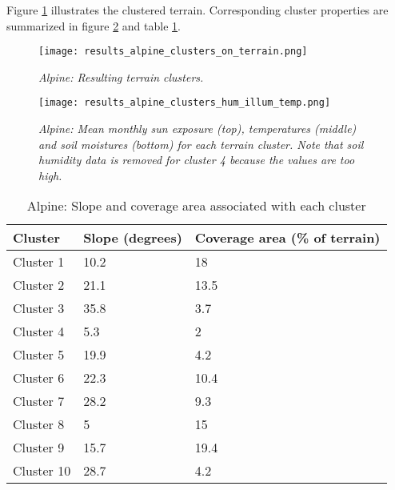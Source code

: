 Figure \ref{fig:results_alpine_terrain_clusters} illustrates the clustered terrain. Corresponding cluster properties are summarized in figure \ref{fig:results_alpine_cluster_hum_temp_illum} and table \ref{tab:results_alpine_cluster_slope_covarea}. 

\begin{figure}[htb!]
\center
	\texttt{[image: results\_alpine\_clusters\_on\_terrain.png]}
	\caption{\textit{Alpine: Resulting terrain clusters.}}
	\label{fig:results_alpine_terrain_clusters}
\end{figure}

\begin{figure}[htb!]
\center
	\texttt{[image: results\_alpine\_clusters\_hum\_illum\_temp.png]}
	\caption{ \textit{Alpine: Mean monthly sun exposure (top), temperatures (middle) and soil moistures (bottom) for each terrain cluster. Note that soil humidity data is removed for cluster 4 because the values are too high.}}
	\label{fig:results_alpine_cluster_hum_temp_illum}
\end{figure}

\begin{table}[htb!]
  \centering
	    \begin{tabular}{|p{5cm}|p{5cm}|p{5cm}|}
		\hline	
  	    Cluster & \textbf{Slope (degrees)} & \textbf{Coverage area (\% of terrain)} \\
  	    \hline	
		Cluster 1 & 10.2 & 18 \\
		\hline
		Cluster 2 & 21.1 & 13.5 \\
		\hline
		Cluster 3 & 35.8 & 3.7 \\
		\hline
		Cluster 4 & 5.3 & 2 \\
		\hline
		Cluster 5 & 19.9 & 4.2 \\
		\hline
		Cluster 6 & 22.3 & 10.4 \\
		\hline
		Cluster 7 & 28.2 & 9.3 \\
		\hline
		Cluster 8 & 5 & 15 \\
		\hline
		Cluster 9 & 15.7 & 19.4 \\
		\hline
		Cluster 10 & 28.7 & 4.2 \\
		\hline
		\end{tabular}
		\caption{Alpine: Slope and coverage area associated with each cluster}
	  \label{tab:results_alpine_cluster_slope_covarea}
\end{table}


